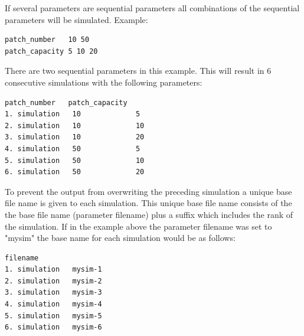 \documentclass[letterpaper,12pt,oneside]{book}
\begin{document}
If several parameters are sequential parameters all combinations of the sequential parameters will be simulated. Example:
\begin{lstlisting}[frame=single]
patch_number   10 50
patch_capacity 5 10 20
\end{lstlisting}
There are two sequential parameters in this example. This will result in 6 consecutive simulations with the following parameters:
\begin{lstlisting}[frame=single]
                patch_number   patch_capacity
1. simulation   10             5
2. simulation   10             10
3. simulation   10             20
4. simulation   50             5
5. simulation   50             10
6. simulation   50             20
\end{lstlisting}


To prevent the output from overwriting the preceding simulation a unique base file name is given to each simulation. This unique base file name consists of the the base file name (parameter \textsf{filename}) plus a suffix which includes the rank of the simulation. If in the example above the parameter \textsf{filename} was set to "mysim" the base name for each simulation would be as follows:
\begin{lstlisting}[frame=single]
                filename
1. simulation   mysim-1
2. simulation   mysim-2
3. simulation   mysim-3
4. simulation   mysim-4
5. simulation   mysim-5
6. simulation   mysim-6
\end{lstlisting}
\end{document}

